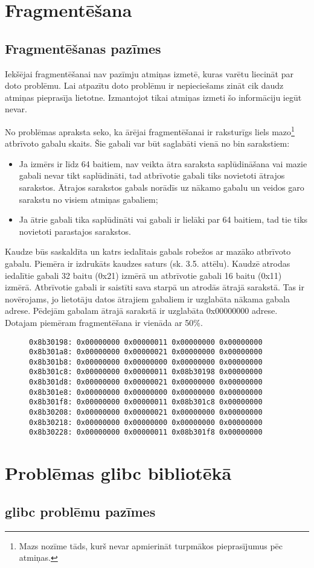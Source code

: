 \section{Fragmentēšana}





\subsection{Fragmentēšanas pazīmes}
Iekšējai fragmentēšanai nav pazīmju atmiņas izmetē, kuras varētu liecināt par doto problēmu.
Lai atpazītu doto problēmu ir nepieciešams zināt cik daudz atmiņas pieprasīja lietotne.
Izmantojot tikai atmiņas izmeti šo informāciju iegūt nevar.

No problēmas apraksta seko, ka ārējai fragmentēšanai ir raksturīgs liels mazo\footnote{Mazs nozīme tāds, kurš nevar apmierināt turpmākos pieprasījumus pēc atmiņas.} atbrīvoto gabalu skaits.
Šie gabali var būt saglabāti vienā no bin sarakstiem:
\begin{itemize}
\item Ja izmērs ir līdz 64 baitiem, nav veikta ātra saraksta saplūdināšana vai mazie gabali nevar tikt saplūdināti, tad atbrīvotie gabali tiks novietoti ātrajos sarakstos.
Ātrajos sarakstos gabals norādīs uz nākamo gabalu un veidos garo sarakstu no visiem atmiņas gabaliem;
\item Ja ātrie gabali tika saplūdināti vai gabali ir lielāki par 64 baitiem, tad tie tiks novietoti parastajos sarakstos.
\end{itemize}

Kaudze būs saskaldīta un katrs iedalītais gabals robežos ar mazāko atbrīvoto gabalu.
Piemēra ir izdrukāts kaudzes saturs (sk. 3.5. attēlu).
Kaudzē atrodas iedalītie gabali 32 baitu (0x21) izmērā un atbrīvotie gabali 16 baitu (0x11) izmērā.
Atbrīvotie gabali ir saistīti sava starpā un atrodās ātrajā sarakstā.
Tas ir novērojams, jo lietotāju datos ātrajiem gabaliem ir uzglabāta nākama gabala adrese.
Pēdejām gabalam ātrajā sarakstā ir uzglabāta 0x00000000 adrese.
Dotajam piemēram fragmentēšana ir vienāda ar 50\%.

\begin{figure}[h]
\begin{lstlisting}[style=customgdb]
0x8b30198: 0x00000000 0x00000011 0x00000000 0x00000000
0x8b301a8: 0x00000000 0x00000021 0x00000000 0x00000000
0x8b301b8: 0x00000000 0x00000000 0x00000000 0x00000000
0x8b301c8: 0x00000000 0x00000011 0x08b30198 0x00000000
0x8b301d8: 0x00000000 0x00000021 0x00000000 0x00000000
0x8b301e8: 0x00000000 0x00000000 0x00000000 0x00000000
0x8b301f8: 0x00000000 0x00000011 0x08b301c8 0x00000000
0x8b30208: 0x00000000 0x00000021 0x00000000 0x00000000
0x8b30218: 0x00000000 0x00000000 0x00000000 0x00000000
0x8b30228: 0x00000000 0x00000011 0x08b301f8 0x00000000
\end{lstlisting}
\caption{\textbf{\fontsize{11}{12}\selectfont {Fragmentētā kaudze}}}
\end{figure}




\section{Problēmas glibc bibliotēkā}
\subsection{glibc problēmu pazīmes}
